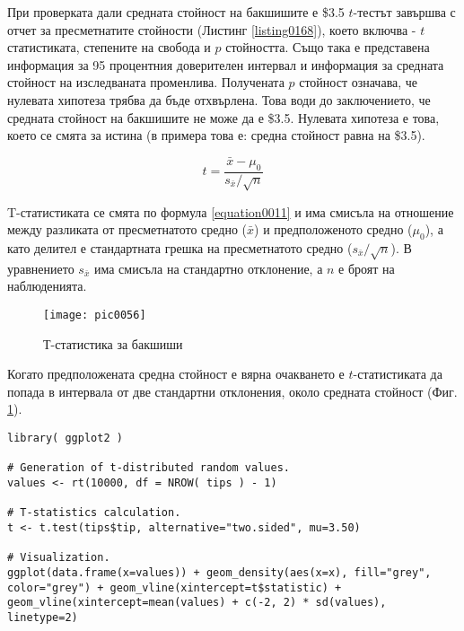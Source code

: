 При проверката дали средната стойност на бакшишите е \$3.5 $t$-тестът завършва с отчет за пресметнатите стойности (Листинг \ref{listing0168}), което включва - $t$ статистиката, степените на свобода и $p$ стойността. Също така е представена информация за 95 процентния доверителен интервал и информация за средната стойност на изследваната променлива. Получената  $p$ стойност означава, че нулевата хипотеза трябва да бъде отхвърлена. Това води до заключението, че средната стойност на бакшишите не може да е \$3.5. Нулевата хипотеза е това, което се смята за истина (в примера това е: средна стойност  равна на \$3.5). 

\begin{equation}
t = \frac{\bar{x}-\mu_0}{s_{\bar{x}}/\sqrt{n}}
\label{equation0011}
\end{equation}

T-статистиката се смята по формула \ref{equation0011} и има смисъла на отношение между разликата от пресметнатото средно ($\bar{x}$) и предположеното средно ($\mu_0$), а като делител е стандартната грешка на пресметнатото средно ($s_{\bar{x}}/\sqrt{n}$). В уравнението $s_{\bar{x}}$ има смисъла на стандартно отклонение, а $n$ е броят на наблюденията. 

\begin{figure}[h!]
  \centering
  \texttt{[image: pic0056]}
  \caption{Т-статистика за бакшиши}
\label{figure0056}
\end{figure}
\FloatBarrier

Когато предположената средна стойност е вярна очакването е $t$-статистиката да попада в интервала от две стандартни отклонения, около средната стойност (Фиг. \ref{figure0056}). 

\begin{lstlisting}[caption=Визуализация на t-разпределение, label=listing0169]
library( ggplot2 )

# Generation of t-distributed random values.
values <- rt(10000, df = NROW( tips ) - 1)

# T-statistics calculation.
t <- t.test(tips$tip, alternative="two.sided", mu=3.50)

# Visualization.
ggplot(data.frame(x=values)) + geom_density(aes(x=x), fill="grey", color="grey") + geom_vline(xintercept=t$statistic) + geom_vline(xintercept=mean(values) + c(-2, 2) * sd(values), linetype=2)
\end{lstlisting}

